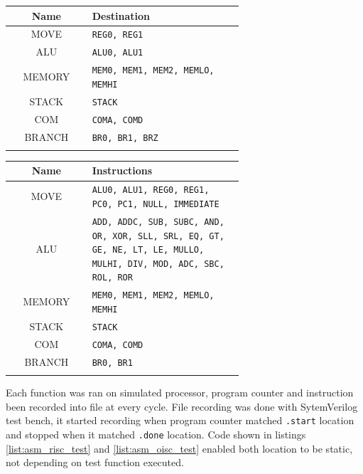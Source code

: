 \begin{blockpage}
	\begin{tabular}{| c | p{0.65\linewidth}|} \hline 
		\rowcolor[rgb]{0.82,0.82,0.82}
		Name & Destination \\\hline
		\arrayrulecolor[rgb]{0.82,0.82,0.82}
		MOVE & \texttt{REG0, REG1} \\\hline
		ALU & \texttt{ALU0, ALU1} \\\hline
		MEMORY & \texttt{MEM0, MEM1, MEM2, MEMLO, MEMHI} \\\hline
		STACK  & \texttt{STACK}\\\hline
		COM & \texttt{COMA, COMD}\\\hline
		BRANCH & \texttt{BR0, BR1, BRZ}\\\hline
		\arrayrulecolor[rgb]{0,0,0}\hline
	\end{tabular}
	\label{tab:instr_groups_oisc_dst}
\end{blockpage}

\begin{blockpage}
	\begin{tabular}{| c | p{0.65\linewidth} |} \hline 
		\rowcolor[rgb]{0.82,0.82,0.82}
		Name & Instructions \\\hline	
		\arrayrulecolor[rgb]{0.82,0.82,0.82}	
		MOVE & \texttt{ALU0, ALU1, REG0, REG1, PC0, PC1, NULL, IMMEDIATE} \\\hline
		ALU & \texttt{ADD, ADDC, SUB, SUBC,
		AND, OR, XOR, SLL,
		SRL, EQ, GT, GE, NE,
		LT, LE, MULLO, MULHI, DIV, MOD,
		ADC, SBC, ROL, ROR} \\\hline
		MEMORY & \texttt{MEM0, MEM1, MEM2, MEMLO, MEMHI} \\\hline
		STACK  & \texttt{STACK} \\\hline
		COM & \texttt{COMA, COMD} \\\hline
		BRANCH & \texttt{BR0, BR1} \\\hline
		\arrayrulecolor[rgb]{0,0,0}\hline
	\end{tabular}
	\label{tab:instr_groups_oisc_src}
\end{blockpage}

Each function was ran on simulated processor, program counter and instruction been recorded into file at every cycle. File recording was done with SytemVerilog test bench, it started recording when program counter matched \texttt{.start} location and stopped when it matched \texttt{.done} location. Code shown in listings \ref{list:asm_risc_test} and \ref{list:asm_oisc_test} enabled both location to be static, not depending on test function executed.

